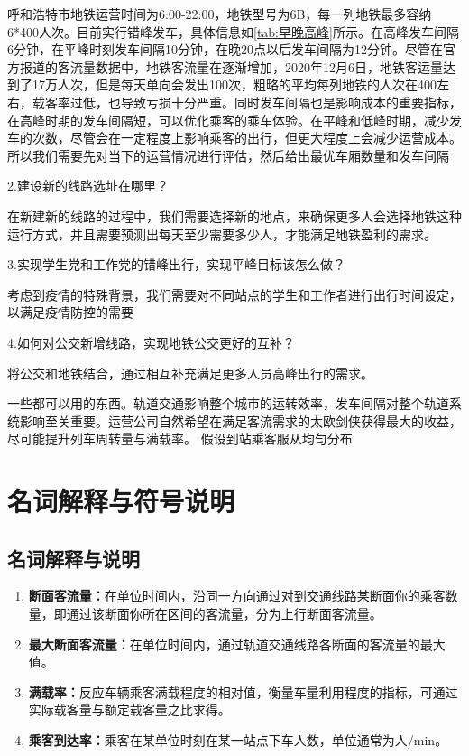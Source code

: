 \documentclass[12pt,a4paper]{mcmthesis}
\newcommand\wordc[1]{\textbf{#1}}
\begin{document}
    呼和浩特市地铁运营时间为6:00-22:00，地铁型号为6B，每一列地铁最多容纳6*400人次。目前实行错峰发车，具体信息如\ref{tab:早晚高峰}所示。在高峰发车间隔6分钟，在平峰时刻发车间隔10分钟，在晚20点以后发车间隔为12分钟。尽管在官方报道的客流量数据中，地铁客流量在逐渐增加，2020年12月6日，地铁客运量达到了17万人次，但是每天单向会发出100次，粗略的平均每列地铁的人次在400左右，载客率过低，也导致亏损十分严重。同时发车间隔也是影响成本的重要指标，在高峰时期的发车间隔短，可以优化乘客的乘车体验。在平峰和低峰时期，减少发车的次数，尽管会在一定程度上影响乘客的出行，但更大程度上会减少运营成本。所以我们需要先对当下的运营情况进行评估，然后给出最优车厢数量和发车间隔


        {2.建设新的线路选址在哪里？}

        {在新建新的线路的过程中，我们需要选择新的地点，来确保更多人会选择地铁这种运行方式，并且需要预测出每天至少需要多少人，才能满足地铁盈利的需求。}

        {3.实现学生党和工作党的错峰出行，实现平峰目标该怎么做？}

        {考虑到疫情的特殊背景，我们需要对不同站点的学生和工作者进行出行时间设定，以满足疫情防控的需要}

        {4.如何对公交新增线路，实现地铁公交更好的互补？}

        {将公交和地铁结合，通过相互补充满足更多人员高峰出行的需求。}

        {一些都可以用的东西。轨道交通影响整个城市的运转效率，发车间隔对整个轨道系统影响至关重要。运营公司自然希望在满足客流需求的太欧剑侠获得最大的收益，尽可能提升列车周转量与满载率。}
        {假设到站乘客服从均匀分布}


    \section{名词解释与符号说明}

    \subsection{名词解释与说明}
    \begin{enumerate}
        \item \wordc{断面客流量：}在单位时间内，沿同一方向通过对到交通线路某断面你的乘客数量，即通过该断面你所在区间的客流量，分为上行断面客流量。

        \item \wordc{最大断面客流量：}在单位时间内，通过轨道交通线路各断面的客流量的最大值。

        \item \wordc{满载率：}反应车辆乘客满载程度的相对值，衡量车量利用程度的指标，可通过实际载客量与额定载客量之比求得。

        \item \wordc{乘客到达率：}乘客在某单位时刻在某一站点下车人数，单位通常为人/min。


    \end{enumerate}
\end{document}
